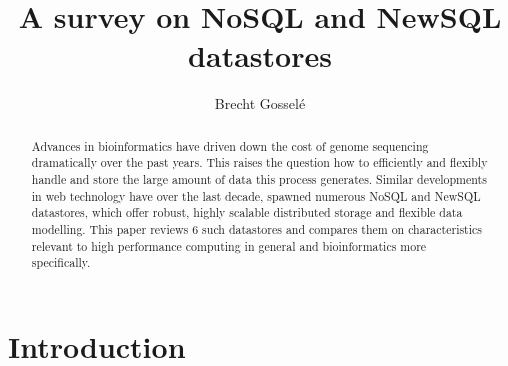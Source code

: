 \documentclass{IEEEtran}
\begin{document}
\title{A survey on NoSQL and NewSQL datastores}
\author{Brecht Gossel\'e}
\maketitle

\begin{abstract}
Advances in bioinformatics have driven down the cost of genome sequencing dramatically over the past years. This raises the question how to efficiently and flexibly handle and store the large amount of data this process generates. Similar developments in web technology have over the last decade, spawned numerous NoSQL and NewSQL datastores, which offer robust, highly scalable distributed storage and flexible data modelling. This paper reviews 6 such datastores and compares them on characteristics relevant to high performance computing in general and bioinformatics more specifically. %
\end{abstract}


\section{Introduction}
\end{document}
